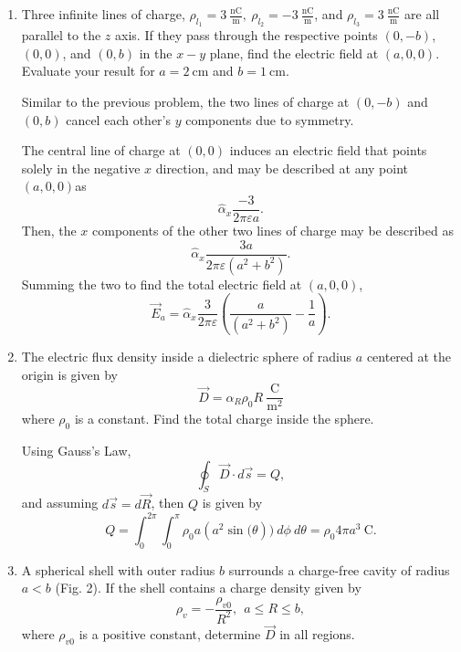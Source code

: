 \documentclass{article}
\begin{document}
\begin{enumerate}[label=\thesubsection]
		First, in terms of \(a\) and \(\theta\), the electric field induced at the origin by the central line of charge, all in the \(y\) direction, may be expressed as
		\[
			-\frac{\rho_l \cos{(\theta)}}{\pi \varepsilon a},
		\]
		and the two other lines of charge as
		\[
			\frac{\rho_l \cos{(\theta)}}{\pi \varepsilon a},
		\]
		and so 
		\[
			\frac{\rho_l \cos{(\theta)}}{\pi \varepsilon a}  - \frac{\rho_l \cos{(\theta)}}{\pi \varepsilon a} = 0.
		\]
		\setcounter{subsection}{20}
	\item Three infinite lines of charge, \(\rho_{l_{1}} = 3 \ \mathrm{\frac{nC}{m}}, \ \rho_{l_2} = -3 \ \mathrm{\frac{nC}{m}}\), and \(\rho_{l_3} = 3  \ \mathrm{\frac{nC}{m}}\) are all parallel to the \(z\) axis. If they pass through the respective points \((0,-b)\), \((0,0)\), and \((0,b)\) in the \(x-y\) plane, find the electric field at \((a,0,0).\) Evaluate your result for \(a=2 \ \mathrm{cm}\) and \(b = 1 \ \mathrm{cm}\).
		
		Similar to the previous problem, the two lines of charge at \((0,-b)\) and \((0,b)\) cancel each other's \(y\) components due to symmetry.

		The central line of charge at \((0,0)\) induces an electric field that points solely in the negative \(x\) direction, and may be described at any point \((a,0,0)\)as 
		\[
			\hat{\alpha}_x \frac{-3}{2 \pi \varepsilon a}.
		\]
		Then, the \(x\) components of the other two lines of charge may be described as
		\[
			\hat{\alpha}_x \frac{3a}{2\pi\varepsilon (a^2+b^2)}.
		\]
		Summing the two to find the total electric field at \((a,0,0)\),
		\[
		\vec{E}_a = \hat{\alpha}_x \frac{3}{2\pi\varepsilon} (\frac{a}{(a^2+b^2)}-\frac{1}{a}).
		\]
		\setcounter{subsection}{25}
	\item The electric flux density inside a dielectric sphere of radius \(a\) centered at the origin is given by 
		\[
			\vec{D} = \hat{\alpha_R}\rho_0 R \ \mathrm{\frac{C}{m^2}}
		\]
		where \(\rho_0\) is a constant. Find the total charge inside the sphere.

		Using Gauss's Law,
		\[
		  \oint_{S}\vec{D}\cdot d \vec{s} = Q,
		\]
		and assuming \(d \vec{s} = d \vec{R}\), then \(Q\) is given by
		\[
			Q = \int_{0}^{2\pi} \int_{0}^{\pi} \rho_0 a (a^2 \sin{(\theta})) \ d\phi \ d\theta = \rho_0 4\pi a^3 \ \mathrm{C}.
		\]
		\setcounter{subsection}{29}
	\item A spherical shell with outer radius \(b\) surrounds a charge-free cavity of radius \(a < b\) (Fig. 2). If the shell contains a charge density given by 
		\[
			\rho_v = -\frac{\rho_{v0}}{R^2}, \ \ a \leq R \leq b,
		\]
		where \(\rho_{v0}\) is a positive constant, determine \(\vec{D}\) in all regions.
		

\end{enumerate}
\end{document}
